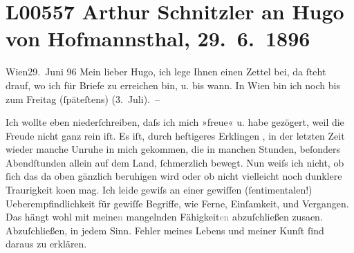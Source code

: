 

\section[Arthur Schnitzler an Hugo von Hofmannsthal, 29. 6. 1896]{L00557 Arthur Schnitzler an Hugo von Hofmannsthal, 29. 6. 1896}
\nopagebreak{}
\rehead{ }\normalsize\beginnumbering{}
\toendnotes[C]{\smallbreak\pagebreak[2]}
\toendnotes[C]{\smallbreak}
\toendnotes[C]{\smallbreak}
\pstart
           \raggedleft{}{\pb}Wien29. Juni 96\pend
           \vspace{0.5em}
\pstart
           Mein lieber Hugo, ich lege Ihnen einen Zettel bei, da{ }ſteht drauf,
               wo ich für Briefe zu erreichen bin, u. bis wann. In Wien bin ich noch bis zum Freitag (ſpäteſtens)
                  (3. Juli). –\pend
           
\pstart
           Ich wollte eben niederſchreiben, daſs ich mich »freue« u. habe gezögert, weil die
               Freude nicht ganz rein iſt. Es iſt, durch heftigeres Erklin{\pb}gen \label{K_L00557-1v}\label{K_L00557-1}, in der letzten Zeit
               wieder manche Unruhe in mich gekommen, die in manchen Stunden, beſonders Abendſtunden
               allein auf dem Land,{ }ſchmerzlich bewegt. Nun weiſs ich nicht, ob{ }ſich das da oben
               gänzlich beruhigen wird oder ob nicht vielleicht noch dunklere Traurigkeit ko{\geminationm}en mag. Ich leide gewiſs an {\pb}einer gewiſſen \introOben{}(\introOben{}ſentimentalen\introOben{}!)\introOben{}
               Ueberempfindlichkeit für gewiſſe Begriffe, wie Ferne, Einſamkeit, und Vergangen. Das
               hängt wohl mit meine\textcolor{gray}{n} mangelnden Fähigkeit\textcolor{gray}{en}{ }\introOben{}abzuſchließen\introOben{} zusa{\geminationm}en.
               Abzuſchließen, in jedem Sinn. Fehler meines Lebens und meiner Kunſt{ }ſind daraus zu
               erklären.\pend
           
